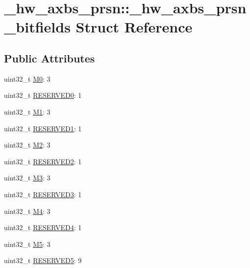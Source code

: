 \hypertarget{struct__hw__axbs__prsn_1_1__hw__axbs__prsn__bitfields}{}\section{\+\_\+hw\+\_\+axbs\+\_\+prsn\+:\+:\+\_\+hw\+\_\+axbs\+\_\+prsn\+\_\+bitfields Struct Reference}
\label{struct__hw__axbs__prsn_1_1__hw__axbs__prsn__bitfields}
\subsection*{Public Attributes}
\begin{DoxyCompactItemize}
\item 
uint32\+\_\+t \hyperlink{struct__hw__axbs__prsn_1_1__hw__axbs__prsn__bitfields_aa8f516932d6c3fec7a6e52ae8447636c}{M0}\+: 3
\item 
uint32\+\_\+t \hyperlink{struct__hw__axbs__prsn_1_1__hw__axbs__prsn__bitfields_ac7d85d46bba2e32741726c1738ca48c4}{R\+E\+S\+E\+R\+V\+E\+D0}\+: 1
\item 
uint32\+\_\+t \hyperlink{struct__hw__axbs__prsn_1_1__hw__axbs__prsn__bitfields_a87788944bc9b745de1a3d9e7f98c8a8e}{M1}\+: 3
\item 
uint32\+\_\+t \hyperlink{struct__hw__axbs__prsn_1_1__hw__axbs__prsn__bitfields_ad7bb34b5c33a3b6bef6776dbe62e726a}{R\+E\+S\+E\+R\+V\+E\+D1}\+: 1
\item 
uint32\+\_\+t \hyperlink{struct__hw__axbs__prsn_1_1__hw__axbs__prsn__bitfields_a21c44745dc735b5b079d6bb168398080}{M2}\+: 3
\item 
uint32\+\_\+t \hyperlink{struct__hw__axbs__prsn_1_1__hw__axbs__prsn__bitfields_a5135701a37f0805495fbef69318b19ed}{R\+E\+S\+E\+R\+V\+E\+D2}\+: 1
\item 
uint32\+\_\+t \hyperlink{struct__hw__axbs__prsn_1_1__hw__axbs__prsn__bitfields_aa0d220267ce250da7020adcbb4f59e5b}{M3}\+: 3
\item 
uint32\+\_\+t \hyperlink{struct__hw__axbs__prsn_1_1__hw__axbs__prsn__bitfields_a9a78e8df63caeb36a83df62c7d6e3117}{R\+E\+S\+E\+R\+V\+E\+D3}\+: 1
\item 
uint32\+\_\+t \hyperlink{struct__hw__axbs__prsn_1_1__hw__axbs__prsn__bitfields_aa218f4c812f2a15692881d6a0ee4a0b9}{M4}\+: 3
\item 
uint32\+\_\+t \hyperlink{struct__hw__axbs__prsn_1_1__hw__axbs__prsn__bitfields_ad07b48039ab417fb2090609917d01848}{R\+E\+S\+E\+R\+V\+E\+D4}\+: 1
\item 
uint32\+\_\+t \hyperlink{struct__hw__axbs__prsn_1_1__hw__axbs__prsn__bitfields_a5630b813abe17fe0afdfa17d0b367d3b}{M5}\+: 3
\item 
uint32\+\_\+t \hyperlink{struct__hw__axbs__prsn_1_1__hw__axbs__prsn__bitfields_a2ce4cb168267d14659355648a2528219}{R\+E\+S\+E\+R\+V\+E\+D5}\+: 9
\end{DoxyCompactItemize}


